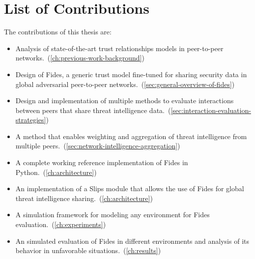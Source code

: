 \section{List of Contributions}
\label{sec:list-of-contributions}
\noindent
The contributions of this thesis are:
\begin{itemize}
    \item Analysis of state-of-the-art trust relationships models in peer-to-peer networks.~(\ref{ch:previous-work-background})
    \item Design of Fides, a generic trust model fine-tuned for sharing security data in global adversarial peer-to-peer networks.~(\ref{sec:general-overview-of-fides})
    \item Design and implementation of multiple methods to evaluate interactions between peers that share threat intelligence data.~(\ref{sec:interaction-evaluation-strategies})
    \item A method that enables weighting and aggregation of threat intelligence from multiple peers.~(\ref{sec:network-intelligence-aggregation})
    \item A complete working reference implementation of Fides in Python.~(\ref{ch:architecture})
    \item An implementation of a Slips module that allows the use of Fides for global threat intelligence sharing.~(\ref{ch:architecture})
    \item A simulation framework for modeling any environment for Fides evaluation.~(\ref{ch:experiments})
    \item An simulated evaluation of Fides in different environments and analysis of its behavior in unfavorable situations.~(\ref{ch:results})
\end{itemize}